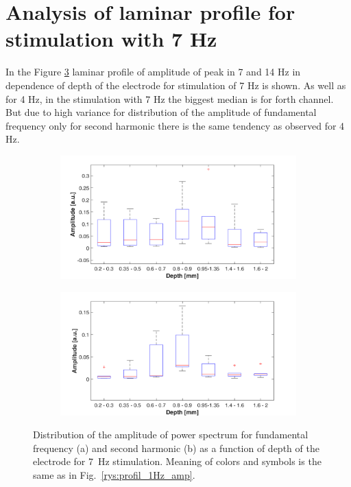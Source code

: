 \documentclass{pracalicmgr}
\begin{document}
\section{Analysis of laminar profile for stimulation with 7 Hz}  

In the Figure \ref{rys:profil_7Hz_wid} laminar profile of amplitude of peak in 7 and 14 Hz in dependence of depth of the electrode for stimulation of 7 Hz is shown. As well as for 4 Hz, in the stimulation with 7 Hz the biggest median is for forth channel. But due to high variance for distribution of the amplitude of fundamental frequency only for second harmonic there is the same tendency  as observed for 4 Hz.


   	\begin{figure}[H]
	\begin{subfigure}{.5\textwidth}
		\centering
		\includegraphics[width=1.\linewidth]{profile_7Hz_wid.png}
		\caption{}
		\label{rys:profil_7Hz_wid1}
	\end{subfigure}%
	\begin{subfigure}{.5\textwidth}
		\centering
		\includegraphics[width=1.\linewidth]{profile_7Hz_wid2.png}
		\caption{}
		\label{rys:profil_7Hz_wid2}
	\end{subfigure}
	\caption{Distribution of the amplitude of power spectrum for fundamental frequency (a) and second harmonic (b) as a function of depth of the electrode for 7~Hz stimulation. Meaning of colors and symbols is the same as in Fig.~\ref{rys:profil_1Hz_amp}.}
	\label{rys:profil_7Hz_wid}
\end{figure}
\end{document}
